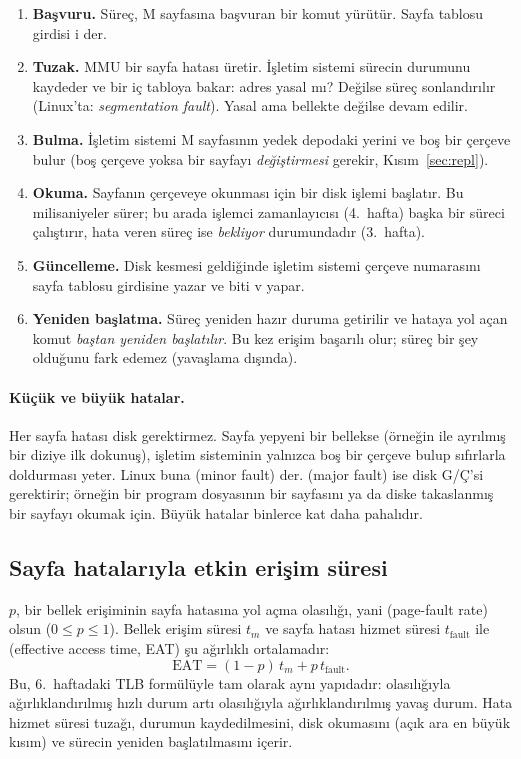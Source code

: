 \begin{enumerate}[leftmargin=1.4em]
  \item \textbf{Başvuru.} Süreç, M sayfasına başvuran bir komut yürütür. Sayfa tablosu girdisi i der.
  \item \textbf{Tuzak.} MMU bir sayfa hatası üretir. İşletim sistemi sürecin durumunu kaydeder ve bir iç tabloya bakar: adres yasal mı? Değilse süreç sonlandırılır (Linux'ta: \emph{segmentation fault}). Yasal ama bellekte değilse devam edilir.
  \item \textbf{Bulma.} İşletim sistemi M sayfasının yedek depodaki yerini ve boş bir çerçeve bulur (boş çerçeve yoksa bir sayfayı \emph{değiştirmesi} gerekir, Kısım~\ref{sec:repl}).
  \item \textbf{Okuma.} Sayfanın çerçeveye okunması için bir disk işlemi başlatır. Bu milisaniyeler sürer; bu arada işlemci zamanlayıcısı (4.\ hafta) başka bir süreci çalıştırır, hata veren süreç ise \emph{bekliyor} durumundadır (3.\ hafta).
  \item \textbf{Güncelleme.} Disk kesmesi geldiğinde işletim sistemi çerçeve numarasını sayfa tablosu girdisine yazar ve biti v yapar.
  \item \textbf{Yeniden başlatma.} Süreç yeniden hazır duruma getirilir ve hataya yol açan komut \emph{baştan yeniden başlatılır}. Bu kez erişim başarılı olur; süreç bir şey olduğunu fark edemez (yavaşlama dışında).
\end{enumerate}

\paragraph{Küçük ve büyük hatalar.} Her sayfa hatası disk gerektirmez. Sayfa yepyeni bir bellekse (örneğin  ile ayrılmış bir diziye ilk dokunuş), işletim sisteminin yalnızca boş bir çerçeve bulup sıfırlarla doldurması yeter. Linux buna  (minor fault) der.  (major fault) ise disk G/Ç'si gerektirir; örneğin bir program dosyasının bir sayfasını ya da diske takaslanmış bir sayfayı okumak için. Büyük hatalar binlerce kat daha pahalıdır.

\subsection{Sayfa hatalarıyla etkin erişim süresi}

$p$, bir bellek erişiminin sayfa hatasına yol açma olasılığı, yani  (page-fault rate) olsun ($0 \le p \le 1$). Bellek erişim süresi $t_m$ ve sayfa hatası hizmet süresi $t_{\text{fault}}$ ile  (effective access time, EAT) şu ağırlıklı ortalamadır:
\[
\text{EAT} = (1-p)\, t_m + p\, t_{\text{fault}} .
\]
Bu, 6.\ haftadaki TLB formülüyle tam olarak aynı yapıdadır: olasılığıyla ağırlıklandırılmış hızlı durum artı olasılığıyla ağırlıklandırılmış yavaş durum. Hata hizmet süresi tuzağı, durumun kaydedilmesini, disk okumasını (açık ara en büyük kısım) ve sürecin yeniden başlatılmasını içerir.

